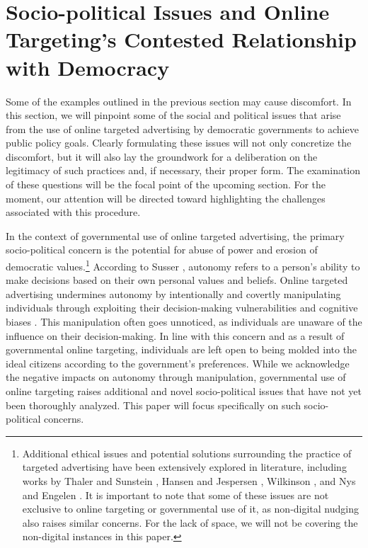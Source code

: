 \documentclass[preprint]{acmart}
\begin{document}
\section{Socio-political Issues and Online Targeting's Contested Relationship with Democracy }

Some of the examples outlined in the previous section may cause discomfort. In this section, we will pinpoint some of the social and political issues that arise from the use of online targeted advertising by democratic governments to achieve public policy goals. Clearly formulating these issues will not only concretize the discomfort, but it will also lay the groundwork for a deliberation on the legitimacy of such practices and, if necessary, their proper form. The examination of these questions will be the focal point of the upcoming section. For the moment, our attention will be directed toward highlighting the challenges associated with this procedure.

In the context of governmental use of online targeted advertising, the primary socio-political concern is the potential for abuse of power and erosion of democratic values.\footnote{Additional ethical issues and potential solutions surrounding the practice of targeted advertising have been extensively explored in literature, including works by Thaler and Sunstein \cite{thaler2008}, Hansen and Jespersen \cite{hansen2013}, Wilkinson \cite{wilkinson2013}, and Nys and Engelen \cite{nys2017}. It is important to note that some of these issues are not exclusive to online targeting or governmental use of it, as non-digital nudging also raises similar concerns. For the lack of space, we will not be covering the non-digital instances in this paper.} According to Susser \cite{susser2019}, autonomy refers to a person's ability to make decisions based on their own personal values and beliefs. Online targeted advertising undermines autonomy by intentionally and covertly manipulating individuals through exploiting their decision-making vulnerabilities and cognitive biases \cite[p.4]{Susserand2019}. This manipulation often goes unnoticed, as individuals are unaware of the influence on their decision-making. In line with this concern and as a result of governmental online targeting, individuals are left open to being molded into the ideal citizens according to the government's preferences. While we acknowledge the negative impacts on autonomy through manipulation, governmental use of online targeting raises additional and novel socio-political issues that have not yet been thoroughly analyzed. This paper will focus specifically on such socio-political concerns.
\end{document}
